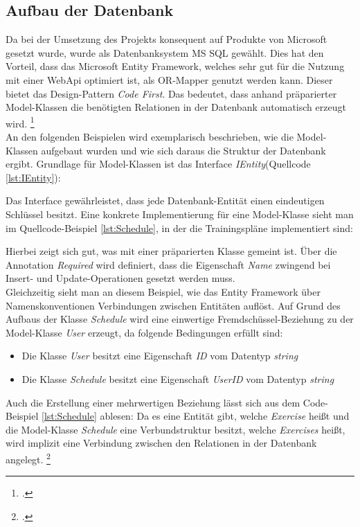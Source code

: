 \subsection{Aufbau der Datenbank}
\label{ssec:aufbau-server-db}
Da bei der Umsetzung des Projekts konsequent auf Produkte von Microsoft gesetzt wurde, wurde als Datenbanksystem \ac{MS SQL} gewählt. Dies hat den Vorteil, dass das \ac{Microsoft Entity Framework}, welches sehr gut für die Nutzung mit einer WebApi optimiert ist, als \gls{OR-Mapper} genutzt werden kann. Dieser bietet das Design-Pattern \textit{Code First}. Das bedeutet, dass anhand präparierter Model-Klassen die benötigten Relationen in der Datenbank automatisch erzeugt wird. \footcite{entity-framework-code-first}\\
An den folgenden Beispielen wird exemplarisch beschrieben, wie die Model-Klassen aufgebaut wurden und wie sich daraus die Struktur der Datenbank ergibt. Grundlage für Model-Klassen ist das Interface \textit{IEntity}(Quellcode \ref{lst:IEntity}):

Das Interface gewährleistet, dass jede Datenbank-Entität einen eindeutigen Schlüssel besitzt.
Eine konkrete Implementierung für eine Model-Klasse sieht man im Quellcode-Beispiel \ref{lst:Schedule}, in der die Trainingspläne implementiert sind:

Hierbei zeigt sich gut, was mit einer präparierten Klasse gemeint ist. Über die Annotation \textit{Required} wird definiert, dass die Eigenschaft \textit{Name} zwingend bei Insert- und Update-Operationen gesetzt werden muss. \\
Gleichzeitig sieht man an diesem Beispiel, wie das Entity Framework über Namenskonventionen Verbindungen zwischen Entitäten auflöst. Auf Grund des Aufbaus der Klasse \textit{Schedule} wird eine \ac{einwertige Fremdschüssel}-Beziehung zu der Model-Klasse \textit{User} erzeugt, da folgende Bedingungen erfüllt sind:
\begin{itemize}
\item Die Klasse \textit{User} besitzt eine Eigenschaft \textit{ID} vom Datentyp \textit{string}
\item Die Klasse \textit{Schedule} besitzt eine Eigenschaft \textit{UserID} vom Datentyp \textit{string}
\end{itemize}
Auch die Erstellung einer \ac{mehrwertigen} Beziehung lässt sich aus dem Code-Beispiel \ref{lst:Schedule} ablesen: Da es eine Entität gibt, welche \textit{Exercise} heißt und die Model-Klasse \textit{Schedule} eine Verbundstruktur besitzt, welche \textit{Exercises} heißt, wird implizit eine Verbindung zwischen den Relationen in der Datenbank angelegt. \footcite{entity-framework-code-first}
